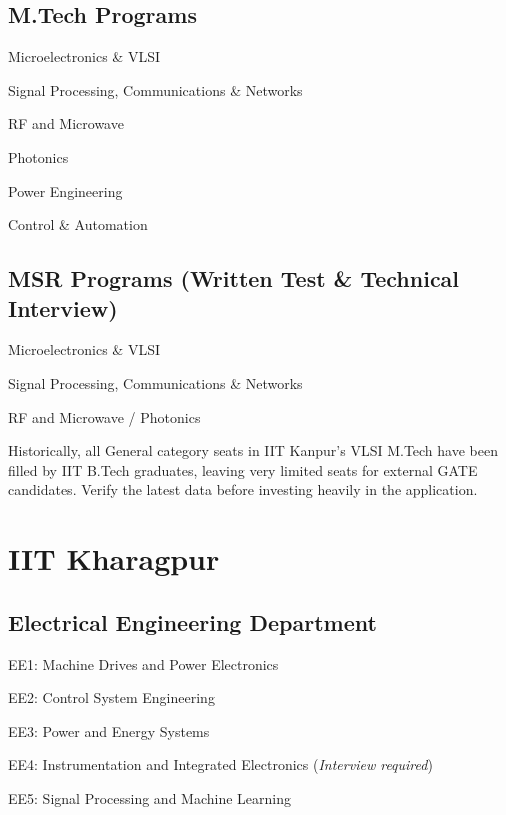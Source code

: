 \subsection*{M.Tech Programs}
\begin{pfChecklist}
  \item Microelectronics \& VLSI
  \item Signal Processing, Communications \& Networks
  \item RF and Microwave
  \item Photonics
  \item Power Engineering
  \item Control \& Automation
\end{pfChecklist}

\subsection*{MSR Programs (Written Test \& Technical Interview)}
\begin{pfChecklist}
  \item Microelectronics \& VLSI
  \item Signal Processing, Communications \& Networks
  \item RF and Microwave / Photonics
\end{pfChecklist}

\begin{protip}
  Historically, all General category seats in IIT Kanpur's VLSI M.Tech have been
  filled by IIT B.Tech graduates, leaving very limited seats for external GATE
  candidates. Verify the latest data before investing heavily in the application.
\end{protip}

\section{IIT Kharagpur}
\label{sec:iitkgp}

\subsection*{Electrical Engineering Department}
\begin{pfChecklist}
  \item EE1: Machine Drives and Power Electronics
  \item EE2: Control System Engineering
  \item EE3: Power and Energy Systems
  \item EE4: Instrumentation and Integrated Electronics (\textit{Interview required})
  \item EE5: Signal Processing and Machine Learning
\end{pfChecklist}

